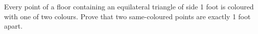 Every point of a floor containing an equilateral triangle of side 1 foot is coloured with one of two colours. Prove that two same-coloured points are exactly 1 foot apart.

